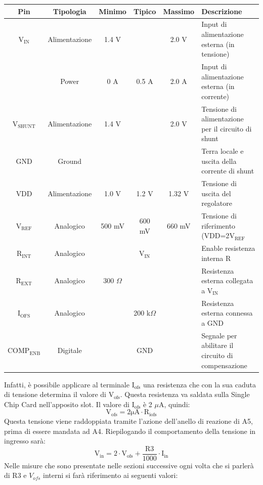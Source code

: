 \begin{center}
\begin{tiny}
\begin{tabular}{|c|c|c|c|c|l|}
\hline
\textbf{Pin} & \textbf{Tipologia} & \textbf{Minimo} & \textbf{Tipico} & \textbf{Massimo} & \textbf{Descrizione} \\ \hline

$\mathrm{V_{IN}}$ & Alimentazione & 1.4 V & & 2.0 V & Input di alimentazione esterna (in tensione)\\ \hline
 & Power & 0 A & 0.5 A & 2.0 A & Input di alimentazione esterna (in corrente)\\ \hline     
$\mathrm{V_{SHUNT}}$ & Alimentazione & 1.4 V & & 2.0 V & Tensione di alimentazione per il circuito di shunt\\ \hline
GND & Ground &  & &  & Terra locale e uscita della corrente di shunt\\ \hline
VDD & Alimentazione & 1.0 V & 1.2 V & 1.32 V & Tensione di uscita del regolatore\\ \hline
$\mathrm{V_{REF}}$ & Analogico & 500 mV & 600 mV & 660 mV & Tensione di riferimento (VDD=2$\mathrm{V_{REF}}$\\ \hline
$\mathrm{R_{INT}}$ & Analogico &  & $\mathrm{V_{IN}}$ &  & Enable resistenza interna R\\ \hline
$\mathrm{R_{EXT}}$ & Analogico & 300 $\Omega$ &  &  & Resistenza esterna collegata a $\mathrm{V_{IN}}$\\ \hline
$\mathrm{I_{OFS}}$ & Analogico &  & 200 k$\Omega$ &  & Resistenza esterna connessa a GND\\ \hline
$\mathrm{COMP_{ENB}}$ & Digitale &  & GND &  & Segnale per abilitare il circuito di compensazione\\ \hline
\end{tabular}
\end{tiny}
\end{center}

Infatti, è possibile applicare al terminale $\mathrm{I_{ofs}}$ una resistenza che con la sua caduta di tensione determina il valore di $\mathrm{V_{ofs}}$. 
Questa resistenza va saldata sulla Single Chip Card nell'apposito slot. Il valore di $\mathrm{I_{ofs}}$ è 2 $\mu$A, quindi:
\begin{equation}
\label{eq:Vofs}
\mathrm{V_{ofs} = 2 \mu A \cdot R_{iofs}}
\end{equation}
Questa tensione viene raddoppiata tramite l'azione dell'anello di reazione di A5, prima di essere mandata ad A4.
Riepilogando il comportamento della tensione in ingresso sarà:
\begin{equation}
\mathrm{V_{in}= 2 \cdot V_{ofs} + \dfrac{R3}{1000} \cdot I_{in}}
\end{equation}
Nelle misure che sono presentate nelle sezioni successive ogni volta che si parlerà di R3 e $V_{ofs}$ interni si farà riferimento ai seguenti valori:


